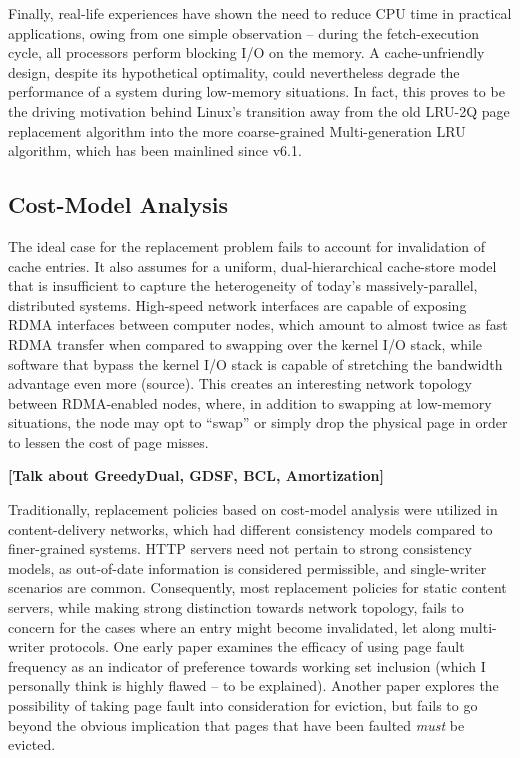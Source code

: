 \documentclass{article}
\begin{document}
Finally, real-life experiences have shown the need to reduce CPU time in practical
applications, owing from one simple observation -- during the fetch-execution
cycle, all processors perform blocking I/O on the memory. A cache-unfriendly
design, despite its hypothetical optimality, could nevertheless degrade the performance
of a system during low-memory situations. In fact, this proves to be the driving
motivation behind Linux's transition away from the old LRU-2Q page replacement
algorithm into the more coarse-grained Multi-generation LRU algorithm, which has
been mainlined since v6.1.

\subsection{Cost-Model Analysis}
The ideal case for the replacement problem fails to account for invalidation of
cache entries. It also assumes for a uniform, dual-hierarchical cache-store model
that is insufficient to capture the heterogeneity of today's massively-parallel,
distributed systems. High-speed network interfaces are capable of exposing RDMA
interfaces between computer nodes, which amount to almost twice as fast RDMA transfer
when compared to swapping over the kernel I/O stack, while software that bypass
the kernel I/O stack is capable of stretching the bandwidth advantage even more
(source). This creates an interesting network topology between RDMA-enabled nodes,
where, in addition to swapping at low-memory situations, the node may opt to ``swap''
or simply drop the physical page in order to lessen the cost of page misses.

\textbf{[Talk about GreedyDual, GDSF, BCL, Amortization]}

Traditionally, replacement policies based on cost-model analysis were utilized in
content-delivery networks, which had different consistency models compared to
finer-grained systems. HTTP servers need not pertain to strong consistency models,
as out-of-date information is considered permissible, and single-writer scenarios
are common. Consequently, most replacement policies for static content servers,
while making strong distinction towards network topology, fails to concern for the
cases where an entry might become invalidated, let along multi-writer protocols.
One early paper \cite{LaRowe_Ellis.Repl_NUMA.1991} examines the efficacy of using
page fault frequency as an indicator of preference towards working set inclusion
(which I personally think is highly flawed -- to be explained). Another paper
\cite{Aguilar_Leiss.Coherence-Replacement.2006} explores the possibility of taking
page fault into consideration for eviction, but fails to go beyond the obvious
implication that pages that have been faulted \emph{must} be evicted.
\end{document}

